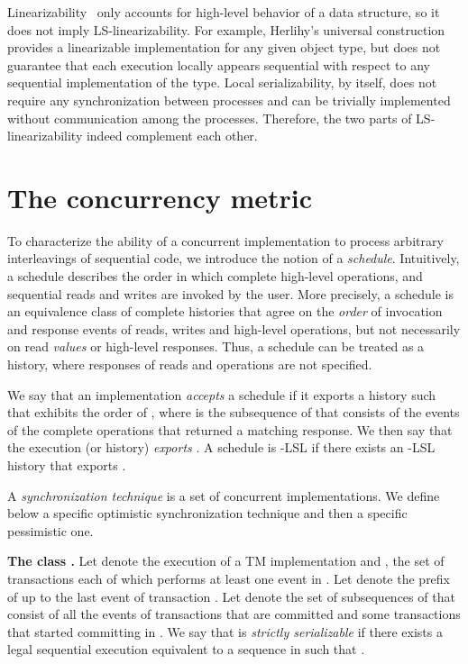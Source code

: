 \documentclass[11pt,pdftex,letterpaper]{article}
\begin{document}
Linearizability~\cite{HW90,AW04} only accounts for high-level
behavior of a data structure,  so it does not imply
LS-linearizability. For example, Herlihy's universal
construction~\cite{Her91} provides a linearizable implementation for
any given object type, but does not guarantee that each execution locally appears
sequential with respect to any sequential implementation of the type.    
Local serializability, by itself, does not require any synchronization
between processes and can be trivially implemented without
communication among the processes.
Therefore, the two parts of LS-linearizability indeed complement each other.  



\section{The concurrency metric}\label{sec:concurrency}
To characterize the ability of a concurrent implementation to process arbitrary interleavings of sequential code, we introduce 
the notion of a \emph{schedule}.
Intuitively, a schedule describes the order in which complete high-level
operations, and sequential reads and writes are invoked by the user. 
More precisely, a schedule is 
an equivalence class of complete histories that agree on
the \emph{order} of invocation and response events of reads, writes and high-level operations, but 
not necessarily on read \emph{values} or high-level responses.
Thus, a schedule can be treated as a history, where responses of reads and operations
are not specified. 

We say that an implementation  \emph{accepts} a schedule  if 
it exports a history  such that  exhibits
the order of , where  is the subsequence of 
that consists of the events of the complete operations that returned a matching response. 
We then say that the execution (or history) \emph{exports} . 
A schedule  is 
-LSL if there
exists an -LSL history that exports .


A \emph{synchronization technique} is a set of concurrent implementations.
We define below a specific optimistic synchronization technique and then
a specific pessimistic one.


\vspace{1mm}\noindent\textbf{The class .}
Let  denote the execution of a TM implementation and
, 
the set of transactions each of which performs at least one event in .
Let  denote the prefix of  up to the last event of transaction .
Let  denote the set of subsequences of   that
consist of all the events of transactions that are committed and some
transactions that started committing in . 
We say that  is \emph{strictly serializable} if 
there exists a legal sequential execution  equivalent to
a sequence in 
such that . 
\end{document}
